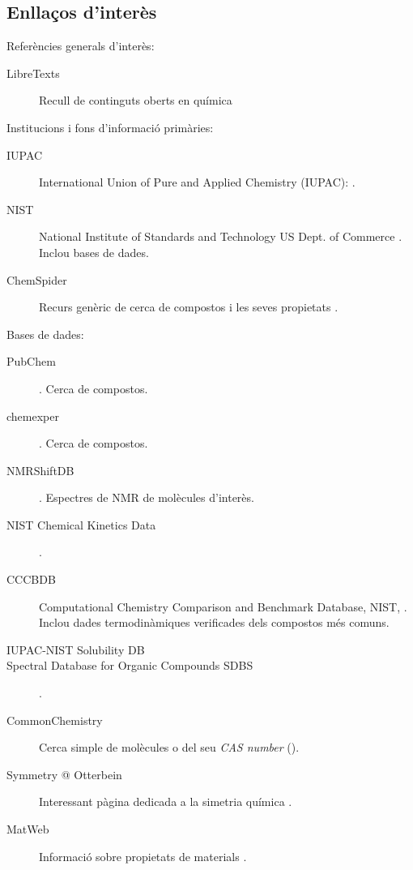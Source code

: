 \documentclass{book}
\begin{document}

%
%


\begin{appendix}
\chapter{Enllaços d'interès}
\label{sec:EnllacosInteres}

Referències generals d'interès:
\begin{description}
\item[LibreTexts] Recull de continguts oberts en química 
\end{description}

Institucions i fons d'informació primàries:
\begin{description}
\item[IUPAC] International Union of Pure and Applied Chemistry (IUPAC): .
\item[NIST] National Institute of Standards and Technology US Dept. of Commerce . Inclou bases de dades.
\item[ChemSpider] Recurs genèric de cerca de compostos i les seves propietats .
\end{description}

Bases de dades:
\begin{description}
\item[PubChem] . Cerca de compostos.
\item[chemexper] . Cerca de compostos. 
\item[NMRShiftDB] . Espectres de NMR de molècules d'interès.
\item[NIST Chemical Kinetics Data] .
\item[CCCBDB] Computational Chemistry Comparison and Benchmark Database, NIST, . Inclou dades termodinàmiques verificades dels compostos més comuns.
\item[IUPAC-NIST Solubility DB] 
\item[Spectral Database for Organic Compounds SDBS] .
\item[CommonChemistry] Cerca simple de molècules o del seu \textit{CAS number} ().
\item[Symmetry @ Otterbein] Interessant pàgina dedicada a la simetria química .
\item[MatWeb] Informació sobre propietats de materials .
\end{description}

  \listoffigures
  \listoftables
  \printbibliography
\end{appendix}
\end{document}
